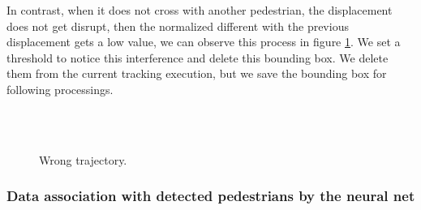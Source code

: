 In contrast, when it does not cross with another pedestrian, the displacement does not get disrupt, then the normalized different with the previous displacement gets a low value, we can observe this process in figure \ref{motion2nocoorrect}. We set a threshold to notice this interference and delete this bounding box. We delete them from the current tracking execution, but we save the bounding box for following processings.

\begin{figure}[H]
		
\centering

\\
\\
\caption{Wrong trajectory.}
\label{motion2nocoorrect}
\end{figure}













\subsubsection{Data association with detected pedestrians by the neural net}


